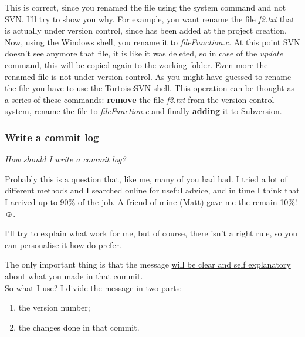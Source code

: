 This is correct, since you renamed the file using the system command and not SVN. I'll try to show you why.
For example, you want rename the file \textit{f2.txt} that is actually under version control, since has been added at the project creation. Now, using the Windows shell, you rename it to \textit{fileFunction.c}. At this point SVN doesn't see anymore that file, it is like it was deleted, so in case of the \textit{update} command, this will be copied again to the working folder. Even more the renamed file is not under version control. As you might have guessed to rename the file you have to use the TortoiseSVN shell. This operation can be thought as a series of these commands: \textbf{remove} the file \textit{f2.txt} from the version control system, rename the file to \textit{fileFunction.c} and finally \textbf{adding} it to Subversion.










\subsubsection{Write a commit log}
\label{subsubsectio:HowWriteRevision}


\textit{How should I write a commit log?}\newline

Probably this is a question that, like me, many of you had had. I tried a lot of different methods and I searched online for useful advice, and in time I think that I arrived up to 90\% of the job. A friend of mine (Matt) gave me the remain 10\%! $\smileface$.

I'll try to explain what work for me, but of course, there isn't a right rule, so you can personalise it how do prefer.

The only important thing is that the message \underline{will be clear and self explanatory} about what you made in that commit.\\

So what I use? I divide the message in two parts: 

\begin{enumerate}

    \item the version number;
    
    \item the changes done in that commit.
    
\end{enumerate}


